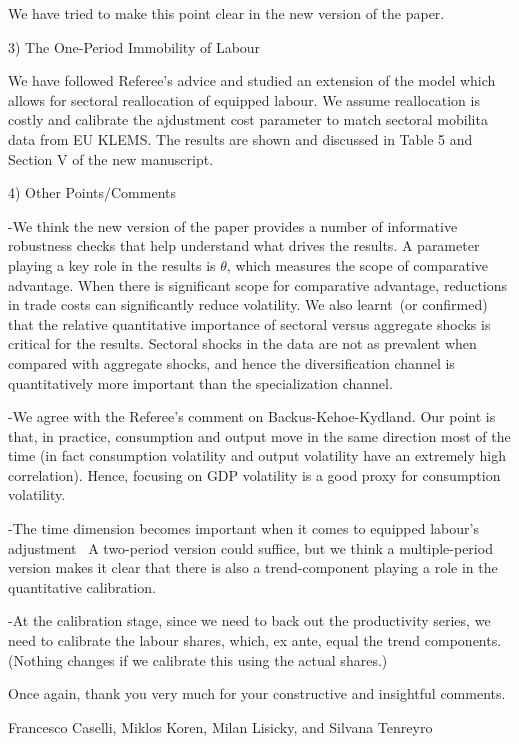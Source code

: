 \documentclass[12pt]{article}
\begin{document}
We have tried to make this point clear in the new version of the paper.

\bigskip

3) The One-Period Immobility of Labour

We have followed Referee's advice and studied an extension of the model
which allows for sectoral reallocation of equipped labour. We assume
reallocation is costly and calibrate the ajdustment cost parameter to match
sectoral mobilita data from EU KLEMS. The results are shown and discussed in
Table 5 and Section V of the new manuscript.

\bigskip

4) Other Points/Comments

-We think the new version of the paper provides a number of informative
robustness checks that help understand what drives the results. A parameter
playing a key role in the results is $\theta $, which measures the scope of
comparative advantage. When there is significant scope for comparative
advantage, reductions in trade costs can significantly reduce volatility. We
also learnt\ (or confirmed) that the relative quantitative importance of
sectoral versus aggregate shocks is critical for the results. Sectoral
shocks in the data are not as prevalent when compared with aggregate shocks,
and hence the diversification channel is quantitatively more important than
the specialization channel.

-We agree with the Referee's comment on Backus-Kehoe-Kydland. Our point is
that, in practice, consumption and output move in the same direction most of
the time (in fact consumption volatility and output volatility have an
extremely high correlation). Hence, focusing on GDP volatility is a good
proxy for consumption volatility.

-The time dimension becomes important when it comes to equipped labour's
adjustment \ A two-period version could suffice, but we think a
multiple-period version makes it clear that there is also a trend-component
playing a role in the quantitative calibration.

-At the calibration stage, since we need to back out the productivity
series, we need to calibrate the labour shares, which, ex ante, equal the
trend components. (Nothing changes if we calibrate this using the actual
shares.)

\medskip \medskip \bigskip

Once again, thank you very much for your constructive and insightful
comments.

Francesco Caselli, Miklos Koren, Milan Lisicky, and Silvana Tenreyro
\end{document}
